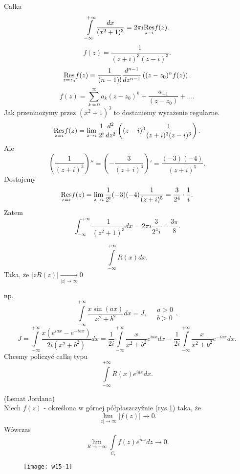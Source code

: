 \documentclass[../main.tex]{subfiles}
\begin{document}
\begin{przyklad}
    Całka
    \[
        \int\limits_{-\infty}^{+\infty} \frac{dx}{(x^{2}+1)^{3}} = 2 \pi i \underset{z = i}{\operatorname{Res}}f(z)
    .\]
\[
    f(z) = \frac{1}{(z+i)^3(z-i)^3}
.\]
\[
    \underset{z = z_0}{\operatorname{Res}} f(z) = \frac{1}{(n-1)!} \frac{d^{n-1}}{dz^{n-1}}\left( (z - z_0)^n f(z) \right)
.\]
\[
    f(z) = \sum_{k = 0}^{\infty} a_k(z-z_0)^k + \frac{a_{-1}}{(z-z_0)} + \ldots
.\]
Jak przemnożymy przez $(x^2 + 1)^3$ to dostaniemy wyrażenie regularne.
\[
    \underset{z = i}{\operatorname{Res}} f(z) = \lim\limits_{z \to i} \frac{1}{2!} \frac{d^2}{dz^2}\left( (z-i)^3 \frac{1}{(z+i)^3(z-i)^3} \right)
.\]
Ale
\[
    \left( \frac{1}{(z+i)^3} \right)'' = \left( -\frac{3}{(z+i)^4} \right)' = \frac{(-3)(-4)}{(z+i)^5}
.\]
Dostajemy
\[
    \underset{z = i}{\operatorname{Res}} f(z) = \lim\limits_{z\to i} \frac{1}{2!} (-3)(-4) \frac{1}{(z+i)^5} = \frac{3}{2^4} \cdot \frac{1}{i}
.\]
Zatem
\[
    \int_{-\infty}^{+\infty} \frac{1}{(z^2 + 1)^3}dx = 2\pi i \frac{3}{2^4 i} = \frac{3\pi}{8}
.\]
\end{przyklad}
\begin{przyklad}
    \[
        \int\limits_{-\infty}^{+\infty}R(x) dx
    .\]
Taka, że $\left| z R(z)\right| \underset{|z|\to \infty}{\longrightarrow} 0 $

np.
\[
    \int\limits_{-\infty}^{+\infty} \frac{x \sin(ax)}{x^2 + b^2}dx = J,\quad \begin{matrix}a > 0\\ b > 0\end{matrix}
.\]
\[
    J = \int\limits_{-\infty}^{+\infty}\frac{x\left( e^{iax} - e^{-iax} \right) }{2i (x^2 + b^2)}dx = \frac{1}{2i}\int\limits_{-\infty}^{+\infty} \frac{x}{x^2 + b^2}e^{iax}dx - \frac{1}{2i}\int\limits_{-\infty}^{+\infty} \frac{x}{x^2 + b^2}e^{-iax}dx
.\]
Chcemy policzyć całkę typu
\[
    \int\limits_{-\infty}^{+\infty}R(x)e^{iax}dx
.\]
\end{przyklad}
\pagebreak
\begin{tw}
    (Lemat Jordana)\\
    Niech $f(z)$ - określona w górnej półpłaszczyźnie (rys \ref{fig:w15-1}) taka, że
    \[
        \lim\limits_{|z|\to \infty}|f(z)| \to 0
    .\]
Wówczas
\[
    \lim\limits_{R\to +\infty} \int\limits_{C_r} f(z)e^{iaz}dz\to 0
.\]
\end{tw}
\begin{figure}[h]
    \centering
    \texttt{[image: w15-1]}
    \label{fig:w15-1}
\end{figure}
\end{document}
